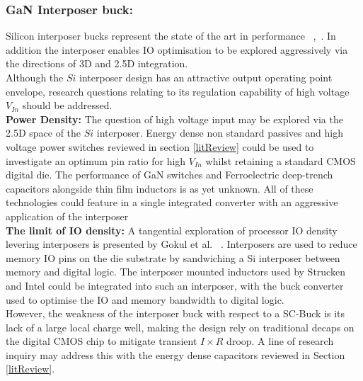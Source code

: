 \documentclass[letterpaper,twocolumn,10pt]{article}
\begin{document}
\subsubsection{GaN Interposer buck: }Silicon interposer bucks represent the state of the art in performance ~\cite{Intel2010},~\cite{Sturcken2013}. In addition the interposer enables IO optimisation to be explored aggressively via the directions of 3D and 2.5D integration.\\
Although the $Si$ interposer design has an attractive output operating point envelope, research questions relating to its regulation capability of high voltage $V_{In}$ should be addressed.\\
\textbf{Power Density: }The question of high voltage input may be explored via the 2.5D space of the $Si$ interposer. Energy dense non standard passives and high voltage power switches reviewed in section \ref{litReview} could be used to investigate an optimum pin ratio for high $V_{In}$ whilst retaining a standard CMOS digital die. The performance of GaN switches and Ferroelectric deep-trench capacitors alongside thin film inductors is as yet unknown. All of these technologies could feature in a single integrated converter with an aggressive application of the interposer\\ 
\textbf{The limit of IO density: }A tangential exploration of processor IO density levering interposers is presented by Gokul et al. ~\cite{Gokul2011}. Interposers are used to reduce memory IO pins on the die substrate by sandwiching a Si interposer between memory and digital logic. The interposer mounted inductors used by Strucken and Intel could be integrated into such an interposer, with the buck converter used to optimise the IO and memory bandwidth to digital logic.\\
However, the weakness of the interposer buck with respect to a SC-Buck is its lack of a large local charge well, making the design rely on traditional decaps on the digital CMOS chip to mitigate transient $I \times R$ droop. A line of research inquiry may address this with the energy dense capacitors reviewed in Section \ref{litReview}.\\ 
       
\end{document}
